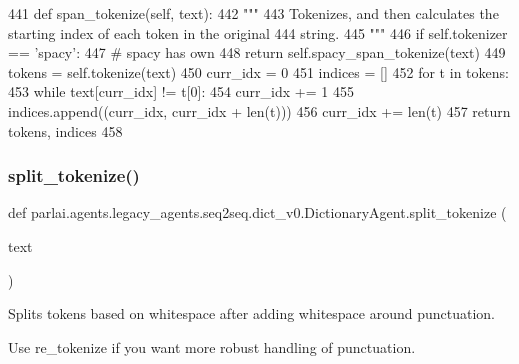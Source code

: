 \begin{DoxyCode}
441     \textcolor{keyword}{def }span\_tokenize(self, text):
442         \textcolor{stringliteral}{"""}
443 \textcolor{stringliteral}{        Tokenizes, and then calculates the starting index of each token in the original}
444 \textcolor{stringliteral}{        string.}
445 \textcolor{stringliteral}{        """}
446         \textcolor{keywordflow}{if} self.tokenizer == \textcolor{stringliteral}{'spacy'}:
447             \textcolor{comment}{# spacy has own}
448             \textcolor{keywordflow}{return} self.spacy\_span\_tokenize(text)
449         tokens = self.tokenize(text)
450         curr\_idx = 0
451         indices = []
452         \textcolor{keywordflow}{for} t \textcolor{keywordflow}{in} tokens:
453             \textcolor{keywordflow}{while} text[curr\_idx] != t[0]:
454                 curr\_idx += 1
455             indices.append((curr\_idx, curr\_idx + len(t)))
456             curr\_idx += len(t)
457         \textcolor{keywordflow}{return} tokens, indices
458 
\end{DoxyCode}
\mbox{\label{classparlai_1_1agents_1_1legacy__agents_1_1seq2seq_1_1dict__v0_1_1DictionaryAgent_a8c2c9af5d9d826650a2dcf0fe6adf2ec}} 
\subsubsection{\texorpdfstring{split\+\_\+tokenize()}{split\_tokenize()}}
{\footnotesize\ttfamily def parlai.\+agents.\+legacy\+\_\+agents.\+seq2seq.\+dict\+\_\+v0.\+Dictionary\+Agent.\+split\+\_\+tokenize (\begin{DoxyParamCaption}\item[{}]{text }\end{DoxyParamCaption})\hspace{0.3cm}{\ttfamily [static]}}

\begin{DoxyVerb}Splits tokens based on whitespace after adding whitespace around punctuation.

Use re_tokenize if you want more robust handling of punctuation.
\end{DoxyVerb}
 


